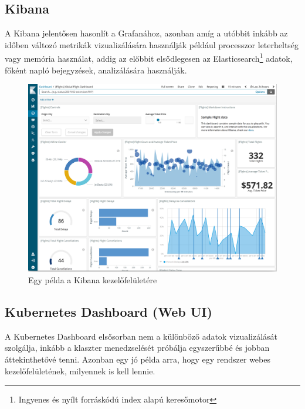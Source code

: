 \subsection{Kibana}
A Kibana\cite{kibana} jelentősen hasonlít a Grafanához, azonban amíg a utóbbit inkább az időben változó metrikák vizualizálására használják például processzor leterheltség vagy memória használat,
addig az előbbit elsődlegesen az Elasticsearch\footnote{Ingyenes és nyílt forráskódú index alapú keresőmotor} adatok, főként napló bejegyzések, analizálására használják.

\begin{figure}[!ht]
    \centering
    \includegraphics[width=150mm, keepaspectratio]{figures/kibana-dashboard.png}
    \caption{Egy példa a Kibana kezelőfelületére}
    \label{fig:kibana}
\end{figure}

\subsection{Kubernetes Dashboard (Web UI)}
A Kubernetes Dashboard\cite{kubernetes-dashboard} elsősorban nem a különböző adatok vizualizálását szolgálja, inkább a klaszter menedzselését próbálja egyszerűbbé és jobban áttekinthetővé tenni.
Azonban egy jó példa arra, hogy egy rendszer webes kezelőfelületének, milyennek is kell lennie.

